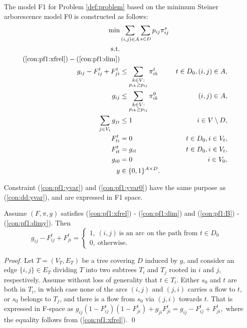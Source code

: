 The model F1 for Problem \ref{def:problem} based on the minimum Steiner arborescence model F0 is constructed as follows: 
\begin{subequations}[resume]
\begin{align}
\min & \sum\limits_{(i,j) \in A} \sum\limits_{s \in D} p_{ij} \pi^s_{ij}\\ 
\notag\text{s.t.} && \\
\notag(\ref{con:pf1:xfrel}) - (\ref{con:pf1:dim})\\
\label{con:pf1:yvar} g_{ij} - F^t_{ij}+F^t_{ji} & \leq \sum\limits_{\substack{k\in V: \\ p_{ik}\geq p_{ij}}}\pi^t_{ik}  & t\in D_0, (i,j)\in A,\\
\label{con:pf1:yvar0} g_{ij} & \leq \sum\limits_{\substack{k\in V: \\ p_{ik}\geq p_{ij}}}\pi^0_{ik}   &  (i,j)\in A,\\
\label{con:pf1:B}  \sum_{j\in V_i}g_{ji}&\leq 1 & i\in V\setminus D,\\
\label{con:pf1:noflowFromT} F_{ti}^t&=0 & t\in D_0, i\in V_t,\\
\label{con:pf1:fitt=xit} F_{it}^t&=g_{it} & t\in D_0, i\in V_t,\\
\label{con:pf1:xi0=0} g_{i0}&=0 & i\in V_0,\\
\label{con:pf1:dimy} y&\in \{0,1\}^{A\times D}.
\end{align}~
\end{subequations}

Constraint (\ref{con:pf1:yvar}) and (\ref{con:pf1:yvar0}) have the same purpose as (\ref{con:dd:yvar}), and are expressed in F1 space. %
\begin{prop}\label{prop:transX}
Assume $(F,\pi,g)$ satisfies (\ref{con:pf1:xfrel}) - (\ref{con:pf1:dim}) and  (\ref{con:pf1:B}) - (\ref{con:pf1:dimy}). Then
$$
g_{ij} - F^t_{ij}+F^t_{ji} = 
	\begin{cases}
		1, ~(i,j)~\text{is an arc on the path from~$t\in D_0$} \\
		0, ~\text{otherwise.}
	\end{cases}
$$
\end{prop}
%
\begin{proof}
Let $T=(V_T,E_T)$ be a tree covering $D$ induced by $g$, and consider an edge $\{i,j\}\in E_T$ dividing $T$ into two subtrees $T_i$ and $T_j$ rooted in $i$ and $j$, respectively.
Assume without loss of generality that $t\in T_i$.
Either $s_0$ and $t$ are both in $T_i$, in which case none of the arcs $(i,j)$ and $(j,i)$ carries a flow to $t$, or $s_0$ belongs to $T_j$, and there is a flow from $s_0$ via $(j,i)$ towards $t$.
That is expressed in F-space as
$
g_{ij}(1-F^{t}_{ij})(1-F^{t}_{ji})+g_{ji}F^{t}_{ji}=g_{ij} - F^t_{ij}+F^t_{ji},
$
where the equality follows from (\ref{con:pf1:xfrel}).
\qed
\end{proof}


